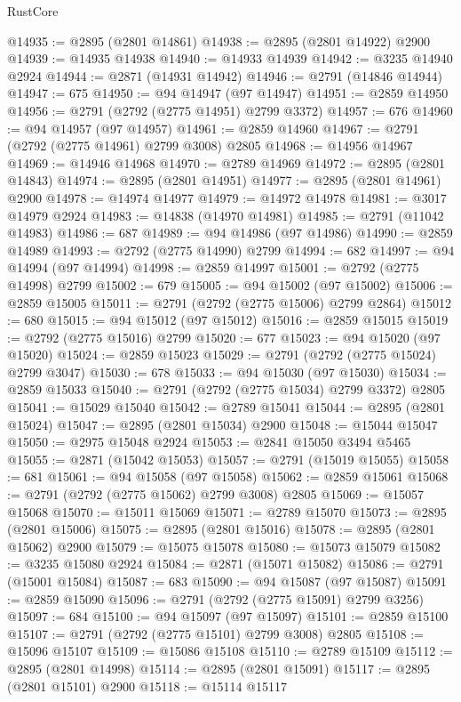 \begin{lexlean}{RustCore}
\begin{coremodule}
@14935 := @2895 (@2801 @14861)
@14938 := @2895 (@2801 @14922) @2900
@14939 := @14935 @14938
@14940 := @14933 @14939
@14942 := @3235 @14940 @2924
@14944 := @2871 (@14931 @14942)
@14946 := @2791 (@14846 @14944)
@14947 := 675
@14950 := @94 @14947 (@97 @14947)
@14951 := @2859 @14950
@14956 := @2791 (@2792 (@2775 @14951) @2799 @3372)
@14957 := 676
@14960 := @94 @14957 (@97 @14957)
@14961 := @2859 @14960
@14967 := @2791 (@2792 (@2775 @14961) @2799 @3008) @2805
@14968 := @14956 @14967
@14969 := @14946 @14968
@14970 := @2789 @14969
@14972 := @2895 (@2801 @14843)
@14974 := @2895 (@2801 @14951)
@14977 := @2895 (@2801 @14961) @2900
@14978 := @14974 @14977
@14979 := @14972 @14978
@14981 := @3017 @14979 @2924
@14983 := @14838 (@14970 @14981)
@14985 := @2791 (@11042 @14983)
@14986 := 687
@14989 := @94 @14986 (@97 @14986)
@14990 := @2859 @14989
@14993 := @2792 (@2775 @14990) @2799
@14994 := 682
@14997 := @94 @14994 (@97 @14994)
@14998 := @2859 @14997
@15001 := @2792 (@2775 @14998) @2799
@15002 := 679
@15005 := @94 @15002 (@97 @15002)
@15006 := @2859 @15005
@15011 := @2791 (@2792 (@2775 @15006) @2799 @2864)
@15012 := 680
@15015 := @94 @15012 (@97 @15012)
@15016 := @2859 @15015
@15019 := @2792 (@2775 @15016) @2799
@15020 := 677
@15023 := @94 @15020 (@97 @15020)
@15024 := @2859 @15023
@15029 := @2791 (@2792 (@2775 @15024) @2799 @3047)
@15030 := 678
@15033 := @94 @15030 (@97 @15030)
@15034 := @2859 @15033
@15040 := @2791 (@2792 (@2775 @15034) @2799 @3372) @2805
@15041 := @15029 @15040
@15042 := @2789 @15041
@15044 := @2895 (@2801 @15024)
@15047 := @2895 (@2801 @15034) @2900
@15048 := @15044 @15047
@15050 := @2975 @15048 @2924
@15053 := @2841 @15050 @3494 @5465
@15055 := @2871 (@15042 @15053)
@15057 := @2791 (@15019 @15055)
@15058 := 681
@15061 := @94 @15058 (@97 @15058)
@15062 := @2859 @15061
@15068 := @2791 (@2792 (@2775 @15062) @2799 @3008) @2805
@15069 := @15057 @15068
@15070 := @15011 @15069
@15071 := @2789 @15070
@15073 := @2895 (@2801 @15006)
@15075 := @2895 (@2801 @15016)
@15078 := @2895 (@2801 @15062) @2900
@15079 := @15075 @15078
@15080 := @15073 @15079
@15082 := @3235 @15080 @2924
@15084 := @2871 (@15071 @15082)
@15086 := @2791 (@15001 @15084)
@15087 := 683
@15090 := @94 @15087 (@97 @15087)
@15091 := @2859 @15090
@15096 := @2791 (@2792 (@2775 @15091) @2799 @3256)
@15097 := 684
@15100 := @94 @15097 (@97 @15097)
@15101 := @2859 @15100
@15107 := @2791 (@2792 (@2775 @15101) @2799 @3008) @2805
@15108 := @15096 @15107
@15109 := @15086 @15108
@15110 := @2789 @15109
@15112 := @2895 (@2801 @14998)
@15114 := @2895 (@2801 @15091)
@15117 := @2895 (@2801 @15101) @2900
@15118 := @15114 @15117

\end{coremodule}
\end{lexlean}
